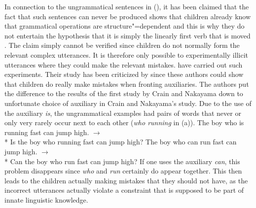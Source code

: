 In connection to the ungrammatical sentences in (), it has been claimed that the fact that such sentences can never be produced shows
that children already know that grammatical operations are structure"=dependent and this is why they do not entertain the hypothesis that it is simply
the linearly first verb that is moved \citep{CN87a-u}. The claim simply cannot be verified since children do not normally form the relevant complex
utterances. It is therefore only possible to experimentally illicit utterances where they could make the relevant mistakes.
\citet{CN87a-u} have carried out such experiments. Their study has been criticized by \citet*{ARP2008a} since these authors could show that children
do really make mistakes when fronting auxiliaries. The authors put the difference to the results of the first study by Crain and Nakayama down to unfortunate choice
of auxiliary in Crain and Nakayama's study. Due to the use of the auxiliary \emph{is}, the ungrammatical examples had pairs of words that never or only
very rarely occur next to each other (\emph{who running} in (a)). 
\eal
\ex {}The boy who is running fast can jump high. $\to$\\
 {}* Is the boy who running fast can jump high?
\ex {}The boy who can run fast can jump high. $\to$\\
 {}* Can the boy who run fast can jump high?
\zl
If one uses the auxiliary \emph{can}, this problem disappears since \emph{who} and \emph{run} certainly do appear together. This then leads to the children
actually making mistakes that they should not have, as the incorrect utterances actually violate a constraint that is supposed to be part of innate
linguistic knowledge.

